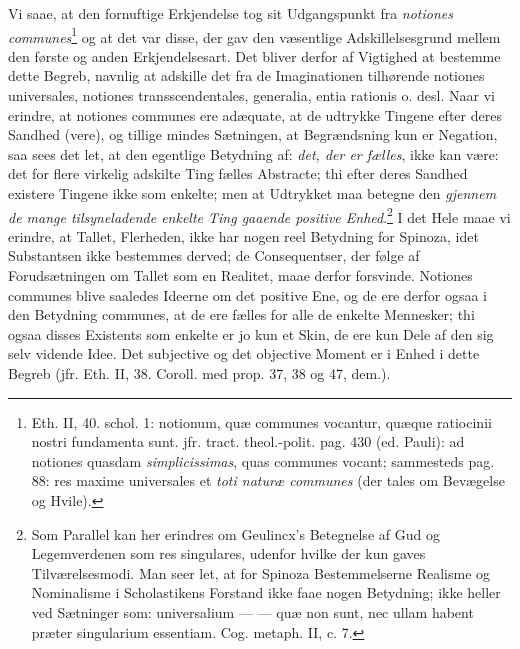 \documentclass[12pt,a4paper]{book}
\newcommand{\opage}[1]{\marginnote{\footnotesize\textit{[#1]}}}
\begin{document}
Vi saae, at den fornuftige Erkjendelse tog sit Udgangspunkt fra
\emph{notiones communes}\footnote{Eth. II, 40. schol. 1: notionum, quæ
communes vocantur, quæque ratiocinii nostri fundamenta sunt. jfr.
tract. theol.-polit. pag. 430 (ed. Pauli): ad notiones quasdam
\emph{simplicissimas}, quas communes vocant; sammesteds pag. 88: res maxime
universales et \emph{toti naturæ communes} (der tales om Bevægelse og
Hvile).} og at det var disse,
\opage{97} \setcounter{footnote}{0}%
der gav den væsentlige Adskillelsesgrund mellem den første og anden
Erkjendelsesart. Det bliver derfor af Vigtighed at bestemme dette
Begreb, navnlig at adskille det fra de Imaginationen tilhørende
notiones universales, notiones transscendentales, generalia, entia
rationis o. desl. Naar vi erindre, at notiones communes ere
adæquate, at de udtrykke Tingene efter deres Sandhed (vere), og
tillige mindes Sætningen, at Begrændsning kun er Negation, saa sees
det let, at den egentlige Betydning af: \emph{det, der er fælles},
ikke kan være: det for flere virkelig adskilte Ting fælles
Abstracte; thi efter deres Sandhed existere Tingene ikke som enkelte;
men at Udtrykket maa betegne den \emph{gjennem de mange
tilsyneladende enkelte Ting gaaende positive
Enhed}.\footnote{Som Parallel kan her erindres om Geulincx's
Betegnelse af Gud og Legemverdenen som res singulares, udenfor
hvilke der kun gaves Tilværelsesmodi. Man seer let, at for Spinoza
Bestemmelserne Realisme og Nominalisme i Scholastikens Forstand ikke
faae nogen Betydning; ikke heller ved Sætninger som: universalium
--- --- quæ non sunt, nec ullam habent præter singularium essentiam.
Cog. metaph. II, c. 7.} I det Hele maae vi erindre, at Tallet,
Flerheden, ikke har nogen reel Betydning for Spinoza, idet
Substantsen ikke bestemmes derved; de Consequentser, der følge af
Forudsætningen om Tallet som en Realitet, maae derfor forsvinde.
Notiones communes blive saaledes Ideerne om det positive Ene, og de
ere derfor ogsaa i den Betydning communes, at de ere fælles for alle
de enkelte Mennesker; thi ogsaa disses Existents som enkelte er jo
kun et Skin, de ere kun Dele af den sig selv vidende Idee. Det
subjective og det objective Moment er i Enhed i dette Begreb (jfr.
Eth. II, 38. Coroll. med prop. 37, 38 og 47, dem.).
\end{document}
